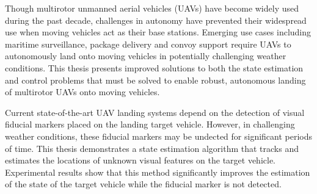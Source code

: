 \afterpage{\cleardoublepage}
Though multirotor unmanned aerial vehicles (UAVs) have become widely used 
during the past decade, challenges in autonomy have prevented their
widespread use when moving vehicles act as their base stations.
Emerging use cases including maritime
surveillance, package delivery and convoy support require UAVs to autonomously
land onto moving vehicles in potentially challenging weather
conditions.
This thesis presents improved solutions to both the state estimation and
control problems that must be solved
to enable robust, autonomous landing of multirotor UAVs onto moving vehicles.

Current state-of-the-art UAV landing systems depend on the detection of visual
fiducial markers placed on the landing target vehicle. However, in challenging
weather conditions, these fiducial markers may be undected for significant
periods of time.
This thesis demonstrates a state estimation algorithm that tracks and estimates
the locations of unknown visual features on the target vehicle.
Experimental results show that this method significantly improves the estimation of the
state of the target vehicle while the fiducial marker is not detected.

